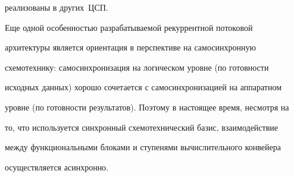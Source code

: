 реализованы в других~ЦСП.





      Еще одной особенностью разрабатываемой рекуррентной потоковой 


архитектуры является ориентация в перспективе на самосинхронную 


схемотехнику: самосинхронизация на логическом уровне (по готовности 


исходных данных) хорошо сочетается с самосинхронизацией на аппаратном 


уровне (по готовности результатов). Поэтому в настоящее время, несмотря на 


то, что используется синхронный схемотехнический базис, взаимодействие 


между функциональными блоками и ступенями вычислительного конвейера 


осуществляется асинхронно.





